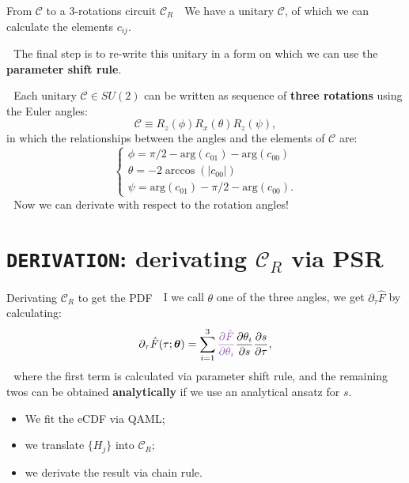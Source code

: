 \documentclass[8pt, xcolor={svgnames}, hyperref={colorlinks, linkcolor=black, citecolor=amethyst, urlcolor=amethyst}]{beamer}
\begin{document}
\begin{frame}{From $\mathcal{C}$ to a 3-rotations circuit $\mathcal{C}_R$}
\large
\faArrowCircleRight\,\, We have a unitary 
$\mathcal{C}$, of which we can calculate the elements $c_{ij}$.
\pause 

\faArrowCircleRight\,\, The final step is to re-write this unitary in a form on 
which we can use the \textbf{parameter shift rule}. 
\pause 

\faArrowCircleRight\,\, Each unitary $\mathcal{C}\in SU(2)$ can be
written as sequence of \textbf{three rotations} using the Euler angles:
\begin{equation}
  \mathcal{C} \equiv R_z(\phi)R_x(\theta)R_z(\psi),
\end{equation}
\pause 
in which the relationships between the angles and the 
elements of $\mathcal{C}$ are:
\begin{equation}
  \begin{cases}
    \phi = \pi/2 - \text{arg}(c_{01}) - \text{arg}(c_{00}) \\
    \theta = -2\arccos(|c_{00}|) \\
    \psi = \text{arg}(c_{01}) - \pi/2 - \text{arg}(c_{00}).
  \end{cases}
\end{equation}
\pause 
\faArrowCircleRight\,\, Now we can derivate with respect to the rotation angles!

\end{frame}

\section{\texttt{DERIVATION}: derivating $\mathcal{C}_R$ via PSR}


\begin{frame}{Derivating $\mathcal{C}_R$ to get the PDF}
\large
\faArrowCircleRight\,\, I we call $\theta$ one of the three angles, we get
$\partial_{\tau} \hat{F}$ by calculating:
\begin{equation}
  \partial_{\tau} \hat{F}(\tau; \bm{\theta}) = 
  \sum_{i=1}^3 \textcolor{amethyst}{\frac{\partial \hat{F}}{\partial\theta_i}} 
  \frac{\partial \theta_i}{\partial s} \frac{\partial s}{\partial \tau},
\end{equation}
\pause
\faArrowCircleRight\,\, where the \textcolor{amethyst}{first term} 
is calculated via parameter shift rule, and the remaining 
twos can be obtained \textbf{analytically} if we use an analytical ansatz for $s$.
\pause
\vspace{0.3cm}
\begin{tcolorbox}[colback=amethyst!15, title=Summary]
\begin{itemize}[noitemsep]
    \item[\faTerminal] We fit the eCDF via QAML;
    \item[\faTerminal] we translate $\{H_j \}$ into $\mathcal{C}_R$;
    \item[\faTerminal] we derivate the result via chain rule.
\end{itemize}
\end{tcolorbox}

\end{frame}
\end{document}
